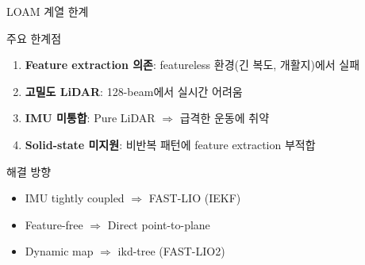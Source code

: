\begin{frame}{LOAM 계열 한계}
  \begin{alertblock}{주요 한계점}
    \begin{enumerate}
      \item \textbf{Feature extraction 의존}: featureless 환경(긴 복도, 개활지)에서 실패
      \item \textbf{고밀도 LiDAR}: 128-beam에서 실시간 어려움
      \item \textbf{IMU 미통합}: Pure LiDAR $\Rightarrow$ 급격한 운동에 취약
      \item \textbf{Solid-state 미지원}: 비반복 패턴에 feature extraction 부적합
    \end{enumerate}
  \end{alertblock}
  \pause
  \begin{block}{해결 방향}
    \begin{itemize}
      \item IMU tightly coupled $\Rightarrow$ FAST-LIO (IEKF)
      \item Feature-free $\Rightarrow$ Direct point-to-plane
      \item Dynamic map $\Rightarrow$ ikd-tree (FAST-LIO2)
    \end{itemize}
  \end{block}
\end{frame}

